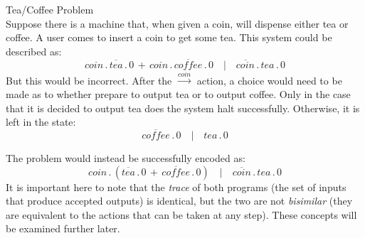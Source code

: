     \begin{example*}{Tea/Coffee Problem\\}
        Suppose there is a machine that, when given a coin, will dispense either tea or coffee.
        A user comes to insert a coin to get some tea.
        This system could be described as:
        \begin{equation*}
            coin \, . \, \overline{tea} \, . \, 0 \, + \, coin \, . \, \overline{coffee} \, . \, 0 \quad | \quad \overline{coin} \, . \, tea \, . \, 0
        \end{equation*}
        But this would be incorrect.
        After the $\xrightarrow{coin}$ action, a choice would need to be made as to whether prepare to output tea or to output coffee.
        Only in the case that it is decided to output tea does the system halt successfully.
        Otherwise, it is left in the state:
        \begin{equation*}
            \overline{coffee} \, . \, 0 \quad | \quad tea \, . \, 0
        \end{equation*}
        
        The problem would instead be successfully encoded as:
        \begin{equation*}
            coin \, . \, (\overline{tea} \, . \, 0 \, + \, \overline{coffee} \, . \, 0) \quad | \quad \overline{coin} \, . \, tea \, . \, 0
        \end{equation*}
        It is important here to note that the \textit{trace} of both programs (the set of inputs that produce accepted outputs) is identical, but the two are not \textit{bisimilar} (they are equivalent to the actions that can be taken at any step).
        These concepts will be examined further later.
    \end{example*}


